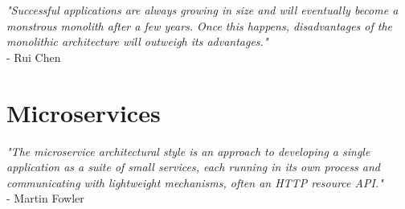 \vspace*{\fill}

\begin{center}
\textit{"Successful applications
	are always growing in size and will eventually become a
	monstrous monolith after a few years. Once this happens,
	disadvantages of the monolithic architecture will outweigh
	its advantages."}\\
\vspace{0.5cm}
- Rui Chen \cite{DataflowDrivenChen}

\end{center}



\vspace*{\fill}



\section{Microservices}
\label{sec:background:microservices}

\vspace*{\fill}

\begin{center}
\textit{ "The microservice architectural style is an approach to developing a single application as a suite of small services, each running in its own process and communicating with lightweight mechanisms, often an HTTP resource API."   } \\
\vspace{0.5cm}
 - Martin Fowler \cite{Fowler}
\end{center}

\vspace*{\fill}

